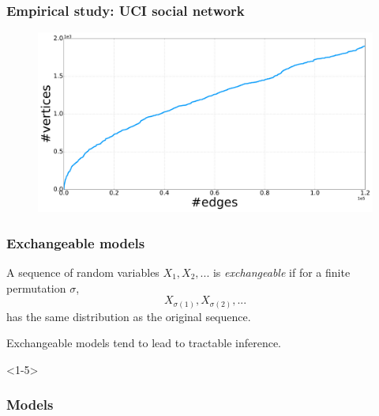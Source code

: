 \documentclass[final,hyperref={pdfpagelabels=false},noamsthm]{beamer}
\begin{document}
\begin{frame}
	\frametitle{Empirical study: UCI social network \cite{snapnets}}
	\begin{figure}[h]
		\includegraphics[width=1.0\textwidth]{fig/n_CollegeMsg_arrival.pdf}
	\end{figure}
\end{frame}

\begin{frame}
	\frametitle{Exchangeable models}
	A sequence of random variables $X_1, X_2, ...$ is \textit{exchangeable} if for a finite permutation $\sigma$,
	\begin{equation*}
		X_{\sigma(1)}, X_{\sigma(2)}, ...
	\end{equation*}
	has the same distribution as the original sequence.
	
	\vspace{20pt}
	Exchangeable models tend to lead to tractable inference.
\end{frame}

\begin{frame}<1-5>
	\frametitle{Models}
	\resizebox{\textwidth}{!}{
		{
			
		}
	}
\end{frame}
\end{document}

